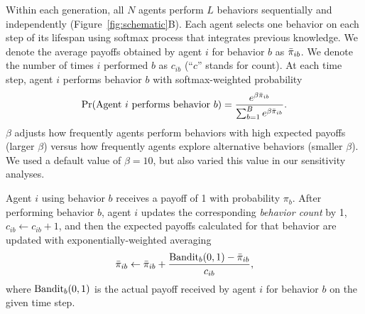 \documentclass[letterpaper,11.5pt]{scrartcl}
\begin{document}
Within each generation, all $N$ agents perform $L$ behaviors sequentially and
independently (Figure~\ref{fig:schematic}B).
Each agent selects one behavior on each step of its lifespan using softmax process that integrates previous knowledge. We denote the average payoffs obtained by agent $i$
for behavior $b$ as $\bar\pi_{ib}$. We denote the number of times $i$ performed $b$
as $c_{ib}$ (``$c$'' stands for count). 
At each time step, agent $i$ performs behavior $b$ with softmax-weighted probability
\begin{equation}
  \Pr(\text{Agent $i$ performs behavior $b$}) = 
    \frac{e^{\beta \bar\pi_{ib}}}{\sum_{b=1}^B e^{\beta \bar\pi_{ib}}}.
\end{equation}
\noindent
$\beta$ adjusts how frequently agents perform 
behaviors with high expected payoffs (larger $\beta$) versus how frequently
agents explore alternative behaviors (smaller $\beta$). %
We used a default value of $\beta = 10$, but also varied this value in our sensitivity analyses. 


Agent $i$ using behavior $b$ receives a payoff of 1 with probability $\pi_b$. 
After performing behavior $b$, agent $i$ updates the
corresponding \emph{behavior count} by 1, $c_{ib} \leftarrow c_{ib} + 1$, and then
the expected payoffs calculated for that behavior are updated with
exponentially-weighted averaging
\begin{equation}
  \bar\pi_{ib} \leftarrow \bar\pi_{ib} + \frac{\text{Bandit}_b(0, 1) - \bar\pi_{ib}}{c_{ib}},
\end{equation}
\noindent
where $\text{Bandit}_b(0, 1)$ is the actual payoff received by agent $i$ for behavior $b$ on the given time step. 
\end{document}
